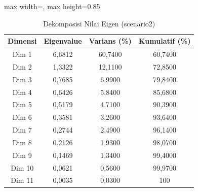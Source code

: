 \begin{table}[H]
\centering
\caption{Dekomposisi Nilai Eigen (scenario2)} \label{tab:app2eigen}
\begin{adjustbox}{max width=\textwidth, max height=0.85\textheight}
\begin{tabular}{|c|c|c|c|}
\hline
\textbf{Dimensi} & \textbf{Eigenvalue} & \textbf{Varians (\%)} & \textbf{Kumulatif (\%)} \\
\hline
Dim 1 & 6,6812 & 60,7400 & 60,7400 \\
Dim 2 & 1,3322 & 12,1100 & 72,8500 \\
Dim 3 & 0,7685 & 6,9900 & 79,8400 \\
Dim 4 & 0,6426 & 5,8400 & 85,6800 \\
Dim 5 & 0,5179 & 4,7100 & 90,3900 \\
Dim 6 & 0,3581 & 3,2600 & 93,6400 \\
Dim 7 & 0,2744 & 2,4900 & 96,1400 \\
Dim 8 & 0,2126 & 1,9300 & 98,0700 \\
Dim 9 & 0,1469 & 1,3400 & 99,4000 \\
Dim 10 & 0,0621 & 0,5600 & 99,9700 \\
Dim 11 & 0,0035 & 0,0300 & 100 \\
\hline
\end{tabular}
\end{adjustbox}
\end{table}